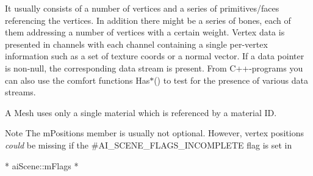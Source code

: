 It usually consists of a number of vertices and a series of primitives/faces referencing the vertices. In addition there might be a series of bones, each of them addressing a number of vertices with a certain weight. Vertex data is presented in channels with each channel containing a single per-\/vertex information such as a set of texture coords or a normal vector. If a data pointer is non-\/null, the corresponding data stream is present. From C++-\/programs you can also use the comfort functions Has$\ast$() to test for the presence of various data streams.

A Mesh uses only a single material which is referenced by a material I\-D. \begin{DoxyNote}{Note}
The m\-Positions member is usually not optional. However, vertex positions {\itshape could} be missing if the \#\-A\-I\-\_\-\-S\-C\-E\-N\-E\-\_\-\-F\-L\-A\-G\-S\-\_\-\-I\-N\-C\-O\-M\-P\-L\-E\-T\-E flag is set in 
\begin{DoxyCode}
* aiScene::mFlags
* 
\end{DoxyCode}
 
\end{DoxyNote}


